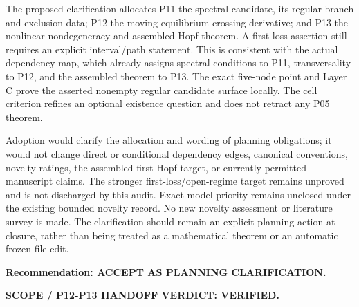 \documentclass[11pt]{article}
\begin{document}
The proposed clarification allocates P11 the spectral candidate, its
regular branch and exclusion data; P12 the moving-equilibrium crossing
derivative; and P13 the nonlinear nondegeneracy and assembled Hopf theorem.
A first-loss assertion still requires an explicit interval/path statement.
This is consistent with the actual dependency map, which already assigns
spectral conditions to P11, transversality to P12, and the assembled theorem
to P13. The exact five-node point and Layer C prove the asserted nonempty
regular candidate surface locally. The cell criterion refines an optional
existence question and does not retract any P05 theorem.

Adoption would clarify the allocation and wording of planning obligations;
it would not change direct or conditional dependency edges, canonical
conventions, novelty ratings, the assembled first-Hopf target, or currently
permitted manuscript claims. The stronger first-loss/open-regime target
remains unproved and is not discharged by this audit. Exact-model priority
remains unclosed under the existing bounded novelty record. No new novelty
assessment or literature survey is made. The clarification should remain
an explicit planning action at closure, rather than being treated as a
mathematical theorem or an automatic frozen-file edit.

\noindent\textbf{Recommendation: ACCEPT AS PLANNING CLARIFICATION.}
\par\noindent\textbf{SCOPE / P12-P13 HANDOFF VERDICT: VERIFIED.}
\end{document}
